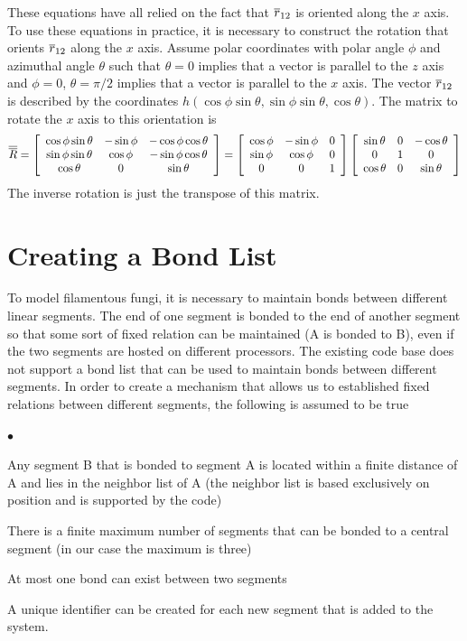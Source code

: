 \documentclass[12pt]{article}
\begin{document}
These equations have all relied on the fact that $\overline{r}_{12}$ is oriented along the
$x$ axis. To use these equations in practice, it is necessary to construct the rotation
that orients $\overline{r}_{12}$ along the $x$ axis. Assume polar coordinates with polar
angle $\phi$ and azimuthal angle $\theta$ such that $\theta = 0$ implies that a vector
is parallel to the $z$ axis and $\phi = 0$, $\theta = \pi/2$ implies that a vector is
parallel to the $x$ axis. The vector $\overline{r}_{12}$ is described by the coordinates
$h(\cos\phi\sin\theta,\sin\phi\sin\theta,\cos\theta)$. The matrix to rotate the $x$ axis
to this orientation is
\[
\overline{\overline{R}}=\left[\begin{array}{ccc}
\cos\phi\sin\theta & -\sin\phi & -\cos\phi\cos\theta \\
\sin\phi\sin\theta & \cos\phi & -\sin\phi\cos\theta \\
\cos\theta & 0 & \sin\theta
\end{array}\right]
=\left[\begin{array}{ccc}
\cos\phi & -\sin\phi & 0 \\
\sin\phi & \cos\phi & 0 \\
0 & 0 & 1\end{array}\right]
\left[\begin{array}{ccc}
\sin\theta & 0 & -\cos\theta \\
0 & 1 & 0 \\
\cos\theta & 0 & \sin\theta
\end{array}\right]
\]
The inverse rotation is just the transpose of this matrix.

\section{Creating a Bond List}
To model filamentous fungi, it is necessary to maintain bonds between
different linear segments. The end of one segment is bonded to the end of another
segment so that some sort of fixed relation can be maintained (A is bonded to B),
even if the two segments are hosted on different processors. The existing code
base does not support a bond list that can be used to maintain bonds
between different segments. In order to create a mechanism that allows us to
established fixed relations between different segments, the following is assumed
to be true
\begin{list}{$\bullet$}{}
\item Any segment B that is bonded to segment A is located within a finite
distance of A and lies in the neighbor list of A (the neighbor list is based
exclusively on position and is supported by the code)
\item There is a finite maximum number of segments that can be bonded to a
central segment (in our case the maximum is three)
\item At most one bond can exist between two segments
\item A unique identifier can be created for each new segment that is added to the
system.
\end{list}
\end{document}
